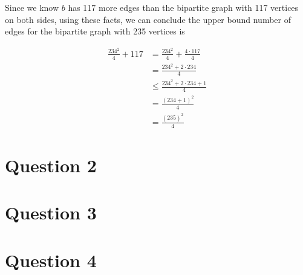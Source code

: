 \documentclass[12pt]{article}
\begin{document}
\begin{enumerate}[a.]
\begin{mdframed}
\begin{enumerate}[1.]
\begin{mdframed}
            \bigskip

            Since we know $b$ has 117 more edges than the bipartite graph with 117 vertices on
            both sides, using these facts, we can conclude the upper bound number of edges for the bipartite
            graph with 235 vertices is

            \begin{align}
                \frac{234^2}{4} + 117 &= \frac{234^2}{4} + \frac{4 \cdot 117}{4}\\
                &= \frac{234^2 + 2 \cdot 234}{4}\\
                &\leq \frac{234^2 + 2 \cdot 234 + 1}{4}\\
                &= \frac{(234+1)^2}{4}\\
                &= \frac{(235)^2}{4}
            \end{align}

            \bigskip
            \end{mdframed}
        \end{enumerate}

    \end{mdframed}
\end{enumerate}

\section*{Question 2}

\section*{Question 3}

\section*{Question 4}
\end{document}
